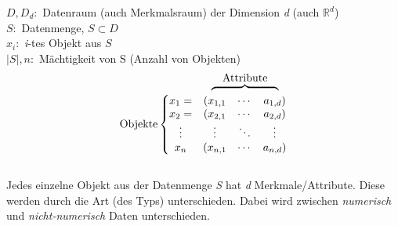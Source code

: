 \noindent\(D,D_d:\) Datenraum (auch Merkmalsraum) der Dimension \textit{d} (auch \(\mathbb{R}^d\))\\

\noindent\(S:\) Datenmenge, \(S \subset D \)\\

\noindent\(x_i:\) \textsl{i}-tes Objekt aus \(S\)\\

\noindent\(|S|,n:\) Mächtigkeit von S (Anzahl von Objekten)\\[5px]

\def\tmp{%
\begin{matrix}
  x_1= &(  x_{1,1} & \cdots & a_{1,d} ) \\
 x_2 = & (  x_{2,1} & \cdots & a_{2,d} ) \\
\vdots &   \vdots  & \ddots & \vdots  \\
 x_n & ( x_{n,1} & \cdots & a_{n,d}  )


\end{matrix}
}%
\[  
\stackMath\def\stackalignment{r}%
  \stackon%
    {\mathrm{\text{Objekte}}\left\{\tmp\right.}%
    {\overbrace{\phantom{\smash{\tmp\mkern -82mu}}}^{\mathrm{\textstyle Attribute}}\mkern 15mu}
\]\\[5px]

Jedes einzelne Objekt aus der Datenmenge \textsl{S} hat \textsl{d} Merkmale/Attribute. Diese werden durch die Art (des Typs) unterschieden. Dabei wird zwischen \textit{numerisch} und \textit{nicht-numerisch} Daten unterschieden. \\

